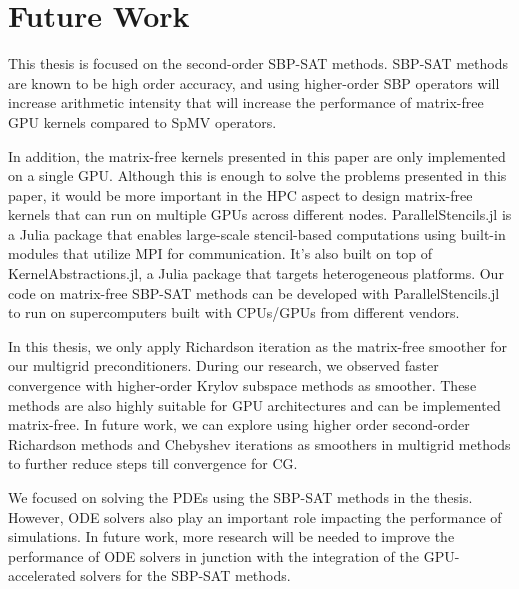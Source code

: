 \section{Future Work}
This thesis is focused on the second-order SBP-SAT methods. SBP-SAT methods are known to be high order accuracy, and using higher-order SBP operators will increase arithmetic intensity that will increase the performance of matrix-free GPU kernels compared to SpMV operators.

In addition, the matrix-free kernels presented in this paper are only implemented on a single GPU. 
Although this is enough to solve the problems presented in this paper, it would be more important in the HPC aspect to design matrix-free kernels that can run on multiple GPUs across different nodes.
ParallelStencils.jl is a Julia package that enables large-scale stencil-based computations using built-in modules that utilize MPI for communication.
It's also built on top of KernelAbstractions.jl, a Julia package that targets heterogeneous platforms.
Our code on matrix-free SBP-SAT methods can be developed with ParallelStencils.jl to run on supercomputers built with CPUs/GPUs from different vendors.

In this thesis, we only apply Richardson iteration as the matrix-free smoother for our multigrid preconditioners. During our research, we observed faster convergence with higher-order Krylov subspace methods as smoother. These methods are also highly suitable for GPU architectures and can be implemented matrix-free.
In future work, we can explore using higher order second-order Richardson methods and Chebyshev iterations as smoothers in multigrid methods to further reduce steps till convergence for CG.

We focused on solving the PDEs using the SBP-SAT methods in the thesis. However, ODE solvers also play an important role impacting the performance of simulations. In future work, more research will be needed to improve the performance of ODE solvers in junction with the integration of the GPU-accelerated solvers for the SBP-SAT methods.